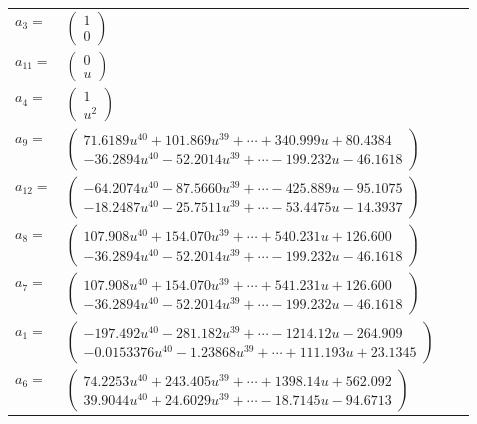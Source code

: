 \documentclass[1p]{elsarticle_modified}
\theoremstyle{definition}
\begin{document}
\begin{tabular}{m{7pt} m{180pt} m{7pt} m{180pt} }
\flushright $a_{3}=$&$\begin{pmatrix}1\\0\end{pmatrix}$ \\
\flushright $a_{11}=$&$\begin{pmatrix}0\\u\end{pmatrix}$ \\
\flushright $a_{4}=$&$\begin{pmatrix}1\\u^2\end{pmatrix}$ \\
\flushright $a_{9}=$&$\begin{pmatrix}71.6189 u^{40}+101.869 u^{39}+\cdots+340.999 u+80.4384\\-36.2894 u^{40}-52.2014 u^{39}+\cdots-199.232 u-46.1618\end{pmatrix}$ \\
\flushright $a_{12}=$&$\begin{pmatrix}-64.2074 u^{40}-87.5660 u^{39}+\cdots-425.889 u-95.1075\\-18.2487 u^{40}-25.7511 u^{39}+\cdots-53.4475 u-14.3937\end{pmatrix}$ \\
\flushright $a_{8}=$&$\begin{pmatrix}107.908 u^{40}+154.070 u^{39}+\cdots+540.231 u+126.600\\-36.2894 u^{40}-52.2014 u^{39}+\cdots-199.232 u-46.1618\end{pmatrix}$ \\
\flushright $a_{7}=$&$\begin{pmatrix}107.908 u^{40}+154.070 u^{39}+\cdots+541.231 u+126.600\\-36.2894 u^{40}-52.2014 u^{39}+\cdots-199.232 u-46.1618\end{pmatrix}$ \\
\flushright $a_{1}=$&$\begin{pmatrix}-197.492 u^{40}-281.182 u^{39}+\cdots-1214.12 u-264.909\\-0.0153376 u^{40}-1.23868 u^{39}+\cdots+111.193 u+23.1345\end{pmatrix}$ \\
\flushright $a_{6}=$&$\begin{pmatrix}74.2253 u^{40}+243.405 u^{39}+\cdots+1398.14 u+562.092\\39.9044 u^{40}+24.6029 u^{39}+\cdots-18.7145 u-94.6713\end{pmatrix}$ \\

\end{tabular}
\end{document}
